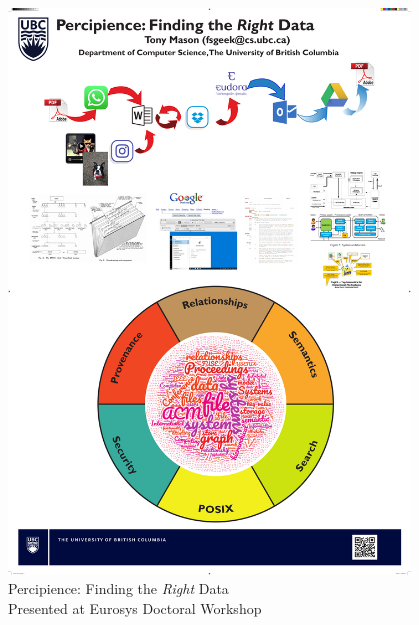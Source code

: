 \begin{figure}[!htb]
    \centering
    \caption{Percipience: Finding the \emph{Right} Data \\ Presented at Eurosys
        Doctoral Workshop}
    \label{figure:eurosysdw-poster}
    \includegraphics[width=0.95\textwidth]{figures/eurossys-dw-poster.pdf}
\end{figure}


